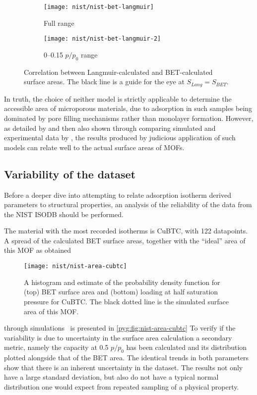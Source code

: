 \begin{figure}[htb]
	\centering

	\begin{subfigure}{0.42\linewidth}
		\texttt{[image: nist/nist-bet-langmuir]}
		\caption{Full range}%
		\label{pyg:fig:nist-bet-langmuir}
	\end{subfigure}%
	\begin{subfigure}{0.5\linewidth}
		\texttt{[image: nist/nist-bet-langmuir-2]}
		\caption{0--0.15 \(p/p_0\) range}%
		\label{pyg:fig:nist-bet-langmuir-adj}
	\end{subfigure}%

	\caption{Correlation between Langmuir-calculated and
		BET-calculated surface areas. The black line is a guide
		for the eye at \(S_{Lang} = S_{BET}\).}%
	\label{pyg:fig:nist-area-cmp}
\end{figure}

In truth, the choice of neither model is strictly
applicable to determine the accessible area of microporous
materials, due to adsorption in such samples being dominated
by pore filling mechanisms rather than monolayer formation.
However, as detailed by
\citet{rouquerolBetEquationApplicable2007}
and then also shown through comparing simulated and
experimental data by
\citet{waltonApplicabilityBETMethod2007}, the results
produced by judicious application of such models can relate
well to the actual surface areas of MOFs.

\subsection{Variability of the dataset}

Before a deeper dive into attempting to relate adsorption isotherm
derived parameters to structural properties, an analysis of the
reliability of the data from the NIST ISODB should be performed.

The material with the most recorded isotherms is CuBTC, with
122 datapoints. A spread of the calculated BET surface areas,
together with the ``ideal'' area of this MOF as obtained
\begin{wrapfigure}{h}{0.5\textwidth}
	\centering
	\texttt{[image: nist/nist-area-cubtc]}%
	\caption{A histogram and estimate of the probability density
		function for (top) BET surface area and (bottom) loading
		at half saturation pressure for CuBTC. The black dotted line
		is the simulated surface area of this MOF.}%
	\label{pyg:fig:nist-area-cubtc}
\end{wrapfigure}
through simulations~\cite{parkHowReproducibleAre2017} is
presented in \autoref{pyg:fig:nist-area-cubtc}
To verify if the variability is due to uncertainty in the
surface area calculation a secondary metric, namely the
capacity at 0.5 \(p/p_0\) has been calculated and its
distribution plotted alongside that of the BET area. The
identical trends in both parameters show that there is an
inherent uncertainty in the dataset. The results not only
have a large standard deviation, but also do not have a
typical normal distribution one would expect from repeated
sampling of a physical property.

